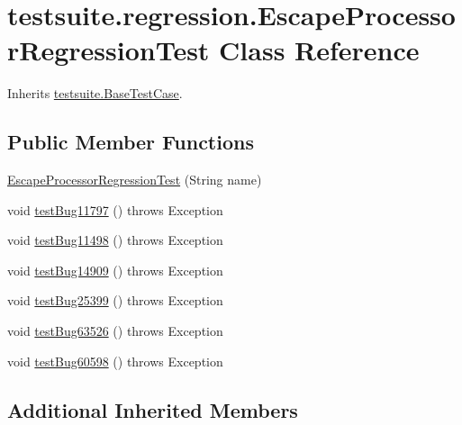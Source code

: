 \hypertarget{classtestsuite_1_1regression_1_1_escape_processor_regression_test}{}\section{testsuite.\+regression.\+Escape\+Processor\+Regression\+Test Class Reference}
\label{classtestsuite_1_1regression_1_1_escape_processor_regression_test}


Inherits \mbox{\hyperlink{classtestsuite_1_1_base_test_case}{testsuite.\+Base\+Test\+Case}}.

\subsection*{Public Member Functions}
\begin{DoxyCompactItemize}
\item 
\mbox{\hyperlink{classtestsuite_1_1regression_1_1_escape_processor_regression_test_aa7a16c7210646feaa7dd9843498289f1}{Escape\+Processor\+Regression\+Test}} (String name)
\item 
void \mbox{\hyperlink{classtestsuite_1_1regression_1_1_escape_processor_regression_test_afce160178129cd6e5455a7da48112250}{test\+Bug11797}} ()  throws Exception 
\item 
void \mbox{\hyperlink{classtestsuite_1_1regression_1_1_escape_processor_regression_test_acee42ee99c924af2e40d07cf935cc3a2}{test\+Bug11498}} ()  throws Exception 
\item 
void \mbox{\hyperlink{classtestsuite_1_1regression_1_1_escape_processor_regression_test_ae70f225ac0aefbe783d3f4a137c0b66d}{test\+Bug14909}} ()  throws Exception 
\item 
void \mbox{\hyperlink{classtestsuite_1_1regression_1_1_escape_processor_regression_test_a807fc950104890375b5291b116c9c45a}{test\+Bug25399}} ()  throws Exception 
\item 
void \mbox{\hyperlink{classtestsuite_1_1regression_1_1_escape_processor_regression_test_a372b0f782e66be889f1351b24530cdc0}{test\+Bug63526}} ()  throws Exception 
\item 
void \mbox{\hyperlink{classtestsuite_1_1regression_1_1_escape_processor_regression_test_a39062afbb30ff8c361ed8fdfaad6f971}{test\+Bug60598}} ()  throws Exception 
\end{DoxyCompactItemize}
\subsection*{Additional Inherited Members}


